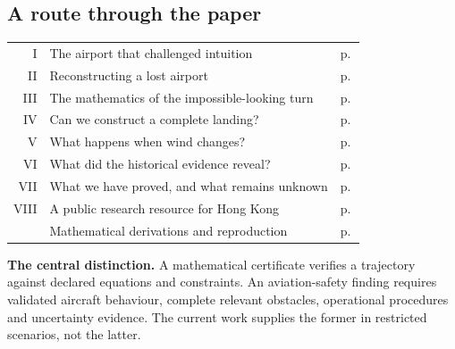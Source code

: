 \subsection*{A route through the paper}
\begin{tabularx}{\textwidth}{@{}rXr@{}}
I & The airport that challenged intuition & p.\,\pageref{part:1}\\
II & Reconstructing a lost airport & p.\,\pageref{part:2}\\
III & The mathematics of the impossible-looking turn & p.\,\pageref{part:3}\\
IV & Can we construct a complete landing? & p.\,\pageref{part:4}\\
V & What happens when wind changes? & p.\,\pageref{part:5}\\
VI & What did the historical evidence reveal? & p.\,\pageref{part:6}\\
VII & What we have proved, and what remains unknown & p.\,\pageref{part:7}\\
VIII & A public research resource for Hong Kong & p.\,\pageref{part:8}\\
 & Mathematical derivations and reproduction & p.\,\pageref{app:dynamics}\\
\end{tabularx}

\medskip\textbf{The central distinction.} A mathematical certificate verifies a trajectory against declared equations and constraints. An aviation-safety finding requires validated aircraft behaviour, complete relevant obstacles, operational procedures and uncertainty evidence. The current work supplies the former in restricted scenarios, not the latter.
\clearpage
